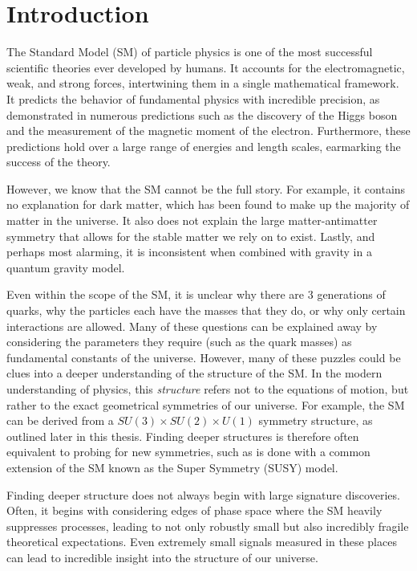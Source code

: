 \chapter{Introduction}

The Standard Model (SM) of particle physics is one of the most successful scientific theories ever developed by humans. It accounts for the electromagnetic, weak, and strong forces, intertwining them in a single mathematical framework. It predicts the behavior of fundamental physics with incredible precision, as demonstrated in numerous predictions such as the discovery of the Higgs boson and the measurement of the magnetic moment of the electron. Furthermore, these predictions hold over a large range of energies and length scales, earmarking the success of the theory.

However, we know that the SM cannot be the full story. For example, it contains no explanation for dark matter, which has been found to make up the majority of matter in the universe. It also does not explain the large matter-antimatter symmetry that allows for the stable matter we rely on to exist. Lastly, and perhaps most alarming, it is inconsistent when combined with gravity in a quantum gravity model. 

Even within the scope of the SM, it is unclear why there are 3 generations of quarks, why the particles each have the masses that they do, or why only certain interactions are allowed. Many of these questions can be explained away by considering the parameters they require (such as the quark masses) as fundamental constants of the universe. However, many of these puzzles could be clues into a deeper understanding of the structure of the SM. In the modern understanding of physics, this \textit{structure} refers not to the equations of motion, but rather to the exact geometrical symmetries of our universe. For example, the SM can be derived from a $SU(3) \times SU(2) \times U(1)$ symmetry structure, as outlined later in this thesis. Finding deeper structures is therefore often equivalent to probing for new symmetries, such as is done with a common extension of the SM known as the Super Symmetry (SUSY) model. 

Finding deeper structure does not always begin with large signature discoveries. Often, it begins with considering edges of phase space where the SM heavily suppresses processes, leading to not only robustly small but also incredibly fragile theoretical expectations. Even extremely small signals measured in these places can lead to incredible insight into the structure of our universe.

